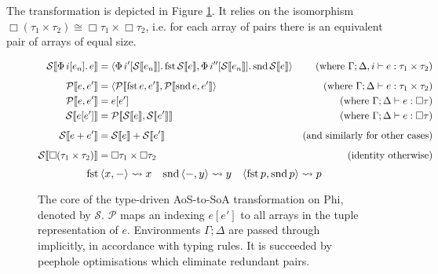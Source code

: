 The transformation is depicted in Figure \ref{fig:aos-to-soa}. 
It relies on the isomorphism $\Box (\tau_1 \times \tau_2) \cong \Box \tau_1 \times \Box \tau_2$, i.e. for each array of pairs there is an equivalent pair of arrays of equal size. 



\newcommand{\phisoa}[1]{\mathcal S \left\llbracket {#1} \right\rrbracket}
\newcommand{\phitupleindex}[2]{\mathcal P \left\llbracket {#1}, {#2} \right\rrbracket}

\begin{figure}[h]
    \centering
    \begin{align*}
\phisoa {\phivec{i}{e_n}{e}}
&= \phipair{\phivec{i'}{\phisoa{e_n}}{\phifst{\phisoa{e}}}}{\phivec{i''}{\phisoa{e_n}}{\phisnd{\phisoa{e}}}}
&\text{(where }\Gamma; \Delta, i \vdash e : \phipairtype{\tau_1}{\tau_2} \text{)} \\[0.5em]
\phitupleindex{e}{e'}
&= \phipair{\phitupleindex{\phifst{e}}{e'}}{\phitupleindex{\phisnd{e}}{e'}}
&\text{(where }\Gamma; \Delta \vdash e : \phipairtype{\tau_1}{\tau_2} \text{)} \\
\phitupleindex{e}{e'}
&= e\left[ e' \right]
&\text{(where }\Gamma; \Delta \vdash e : \phivectype{\tau} \text{)} \\
\phisoa{e[e']}
&= \phitupleindex{\phisoa{e}}{\phisoa{e'}}
&\text{(where }\Gamma; \Delta \vdash e : \phivectype{\tau} \text{)} \\[0.5em]
\phisoa{e + e'}
&= \phisoa{e} + \phisoa{e'}
&\text{(and similarly for other cases)} \\[0.5em]
\phisoa{\phivectype{(\phipairtype{\tau_1}{\tau_2}})} &= \phipairtype{\phivectype{\tau_1}}{\phivectype{\tau_2}} &\text{(identity otherwise)}
    \end{align*}
$$ \phifst{\phipair{x}{-}} \leadsto x \quad \phisnd{\phipair{-}{y}} \leadsto y \quad \phipair{\phifst{p}}{\phisnd{p}} \leadsto p $$
    \caption{The core of the type-driven AoS-to-SoA transformation on Phi, denoted by $\mathcal S$. $\mathcal P$ maps an indexing $e[e']$ to all arrays in the tuple representation of $e$. Environments $\Gamma; \Delta$ are passed through implicitly, in accordance with typing rules. It is succeeded by peephole optimisations which eliminate redundant pairs.}
    \label{fig:aos-to-soa}
\end{figure}


